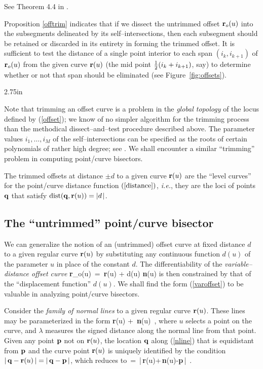 \prf See Theorem 4.4 in \cite{farouki90a}. \QED

Proposition \ref{offtrim} indicates that if we dissect the
untrimmed offset ${\bf r}_o(u)$ into the subsegments delineated by
its self--intersections, then each subsegment should be retained
or discarded in its entirety in forming the trimmed offset. It is
sufficient to test the distance of a single point interior to each
span $(i_k,i_{k+1})$ of ${\bf r}_o(u)$ from the given curve ${\bf r}
(u)$ (the mid point $\textstyle{1 \over 2}\displaystyle(i_k+i_{k+1})$, say) to determine whether
or not that span should be eliminated (see Figure~\ref{fig:offsets}).

{2.75in}

Note that trimming an offset curve is a problem in the {\it global
topology\/} of the locus defined by (\ref{offset}); we know of
no simpler algorithm for the trimming process than the methodical
dissect--and--test procedure described above. The parameter values
${i_1,\ldots,i_M}$ of the self--intersections can be specified as
the roots of certain polynomials of rather high degree; see \cite
{farouki90b}. We shall encounter a similar ``trimming'' problem in
computing point/curve bisectors.

\begin{rmk}
{\rm
The trimmed offsets at distance $\pm d$ to a given curve ${\bf r}(u)$
are the ``level curves'' for the point/curve distance function $(\ref
{distance})$, {\it i.e.}, they are the loci of points ${\bf q}$ that
satisfy ${\rm dist}({\bf q},{\bf r}(u))=|d\;\!|$.
}
\end{rmk}

\subsection{The ``untrimmed'' point/curve bisector}
\label{sec:untrim}

We can generalize the notion of an (untrimmed) offset curve at fixed
distance $d$ to a given regular curve ${\bf r}(u)$ by substituting
any continuous function $d(u)$ of the parameter $u$ in place of the
constant $d$. The differentiability of the {\it variable--distance
offset curve}
\be \label{varoffset}
{\bf r}_o(u) \,=\, {\bf r}(u) + d(u) {\bf n}(u)
\ee
is then constrained by that of the ``displacement function'' $d(u)$.
We shall find the form (\ref{varoffset}) to be valuable in analyzing
point/curve bisectors.

Consider the {\it family of normal lines\/} to a given regular curve
${\bf r}(u)$. These lines may be parameterized in the form
\be \label{nline}
{\bf r}(u) + \lambda\,{\bf n}(u) \,,
\ee
where $u$ selects a point on the curve, and $\lambda$ measures the
signed distance along the normal line from that point. Given any point
${\bf p}$ not on ${\bf r}(u)$, the location ${\bf q}$
along (\ref{nline}) that is equidistant from ${\bf p}$ and
the curve point ${\bf r}(u)$ is uniquely identified by the condition
$|\,{\bf q}-{\bf r}(u)\,|=|\,{\bf q}-{\bf p}\,|$, which reduces to
\be \label{lambda}
\lambda \,=\, |\,{\bf r}(u)+\lambda\,{\bf n}(u)-{\bf p}\,| \,.
\ee


